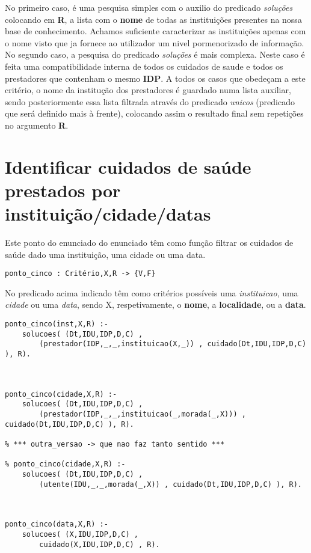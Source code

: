 \documentclass{report}
\def\titulo#1{\section{#1}}
\begin{document}
No primeiro caso, é uma pesquisa simples com o auxilio do predicado \textit{soluções} colocando em \textbf{R}, a lista com o \textbf{nome} de todas as instituições presentes na nossa base de conhecimento. Achamos suficiente caracterizar as instituições apenas com o nome visto que ja fornece ao utilizador um nivel pormenorizado de informação.
No segundo caso, a pesquisa do predicado \textit{soluções} é mais complexa. Neste caso é feita uma compatibilidade interna de todos os cuidados de saude e todos os prestadores que contenham o mesmo \textbf{IDP}. A todos os casos que obedeçam a este critério, o nome da institução dos prestadores é guardado numa lista auxiliar, sendo posteriormente essa lista filtrada através do predicado \textit{unicos} (predicado que será definido mais à frente), colocando assim o resultado final sem repetições no argumento \textbf{R}. 












\titulo{Identificar cuidados de saúde prestados por instituição/cidade/datas}

Este ponto do enunciado do enunciado têm como função filtrar os cuidados de saúde dado uma instituição, uma cidade ou uma data.

\begin{verbatim}
ponto_cinco : Critério,X,R -> {V,F}
\end{verbatim}

No predicado acima indicado têm como critérios possíveis uma \textit{instituicao}, uma \textit{cidade} ou uma \textit{data}, sendo X, respetivamente, o \textbf{nome}, a \textbf{localidade}, ou a \textbf{data}.

\begin{verbatim}
ponto_cinco(inst,X,R) :- 
    solucoes( (Dt,IDU,IDP,D,C) , 
        (prestador(IDP,_,_,instituicao(X,_)) , cuidado(Dt,IDU,IDP,D,C) ), R).



ponto_cinco(cidade,X,R) :- 
    solucoes( (Dt,IDU,IDP,D,C) , 
        (prestador(IDP,_,_,instituicao(_,morada(_,X))) , cuidado(Dt,IDU,IDP,D,C) ), R).

% *** outra_versao -> que nao faz tanto sentido ***

% ponto_cinco(cidade,X,R) :- 
    solucoes( (Dt,IDU,IDP,D,C) , 
        (utente(IDU,_,_,morada(_,X)) , cuidado(Dt,IDU,IDP,D,C) ), R).



ponto_cinco(data,X,R) :- 
    solucoes( (X,IDU,IDP,D,C) , 
        cuidado(X,IDU,IDP,D,C) , R).
\end{verbatim}
\end{document}
